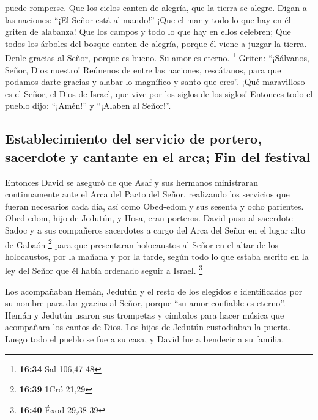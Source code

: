 puede romperse.  Que los cielos canten de alegría, que la
tierra se alegre. Digan a las naciones: ``¡El Señor está al mando!''
 ¡Que el mar y todo lo que hay en él griten de alabanza!
Que los campos y todo lo que hay en ellos celebren;  Que
todos los árboles del bosque canten de alegría, porque él viene a juzgar
la tierra.  Denle gracias al Señor, porque es bueno. Su
amor es eterno. \footnote{\textbf{16:34} Sal 106,47-48} 
Griten: ``¡Sálvanos, Señor, Dios nuestro! Reúnenos de entre las
naciones, rescátanos, para que podamos darte gracias y alabar lo
magnífico y santo que eres''.  ¡Qué maravilloso es el
Señor, el Dios de Israel, que vive por los siglos de los siglos!
Entonces todo el pueblo dijo: ``¡Amén!'' y ``¡Alaben al Señor!''.

\hypertarget{establecimiento-del-servicio-de-portero-sacerdote-y-cantante-en-el-arca-fin-del-festival}{%
\subsection{Establecimiento del servicio de portero, sacerdote y
cantante en el arca; Fin del
festival}\label{establecimiento-del-servicio-de-portero-sacerdote-y-cantante-en-el-arca-fin-del-festival}}

 Entonces David se aseguró de que Asaf y sus hermanos
ministraran continuamente ante el Arca del Pacto del Señor, realizando
los servicios que fueran necesarios cada día,  así como
Obed-edom y sus sesenta y ocho parientes. Obed-edom, hijo de Jedutún, y
Hosa, eran porteros.  David puso al sacerdote Sadoc y a
sus compañeros sacerdotes a cargo del Arca del Señor en el lugar alto de
Gabaón \footnote{\textbf{16:39} 1Cró 21,29}  para que
presentaran holocaustos al Señor en el altar de los holocaustos, por la
mañana y por la tarde, según todo lo que estaba escrito en la ley del
Señor que él había ordenado seguir a Israel. \footnote{\textbf{16:40}
  Éxod 29,38-39}

 Los acompañaban Hemán, Jedutún y el resto de los
elegidos e identificados por su nombre para dar gracias al Señor, porque
``su amor confiable es eterno''.  Hemán y Jedutún usaron
sus trompetas y címbalos para hacer música que acompañara los cantos de
Dios. Los hijos de Jedutún custodiaban la puerta.  Luego
todo el pueblo se fue a su casa, y David fue a bendecir a su familia.

